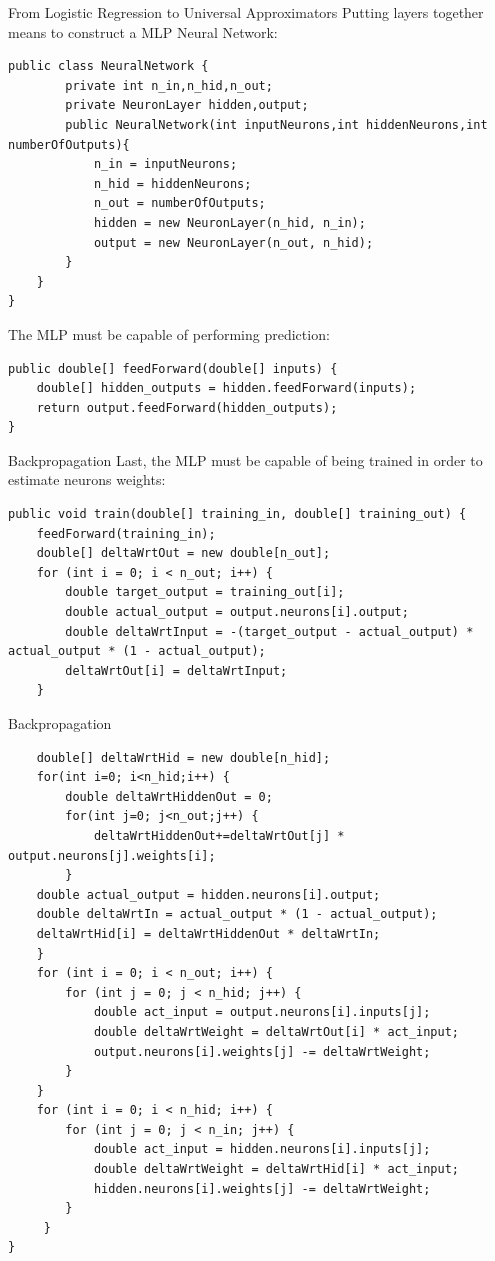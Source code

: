 \documentclass[xcolor ={table,usenames,dvipsnames}]{beamer}
\theoremstyle{definition}
\begin{document}
\begin{frame}[fragile]{From Logistic Regression to Universal Approximators}
Putting layers together means to construct a MLP Neural Network:
\begin{lstlisting}
public class NeuralNetwork {
		private int n_in,n_hid,n_out;
		private NeuronLayer hidden,output;
		public NeuralNetwork(int inputNeurons,int hiddenNeurons,int numberOfOutputs){
			n_in = inputNeurons;
			n_hid = hiddenNeurons;
			n_out = numberOfOutputs;
			hidden = new NeuronLayer(n_hid, n_in);
			output = new NeuronLayer(n_out, n_hid);
		}
	}
}
\end{lstlisting}
The MLP must be capable of performing prediction:
\begin{lstlisting}
public double[] feedForward(double[] inputs) {
	double[] hidden_outputs = hidden.feedForward(inputs);
	return output.feedForward(hidden_outputs);
}
\end{lstlisting}
\end{frame}
\begin{frame}[fragile]{Backpropagation}
Last, the MLP must be capable of being trained in order to estimate neurons weights:
\begin{lstlisting}
public void train(double[] training_in, double[] training_out) {
	feedForward(training_in);
	double[] deltaWrtOut = new double[n_out];
	for (int i = 0; i < n_out; i++) {
		double target_output = training_out[i];
		double actual_output = output.neurons[i].output;
		double deltaWrtInput = -(target_output - actual_output) * actual_output * (1 - actual_output);
		deltaWrtOut[i] = deltaWrtInput;
	}
\end{lstlisting}
\end{frame}
\begin{frame}[fragile]{Backpropagation}
\begin{lstlisting}
	double[] deltaWrtHid = new double[n_hid];
	for(int i=0; i<n_hid;i++) {
		double deltaWrtHiddenOut = 0;
		for(int j=0; j<n_out;j++) {
			deltaWrtHiddenOut+=deltaWrtOut[j] * output.neurons[j].weights[i];
		}
	double actual_output = hidden.neurons[i].output;
	double deltaWrtIn = actual_output * (1 - actual_output);
	deltaWrtHid[i] = deltaWrtHiddenOut * deltaWrtIn;
	}
	for (int i = 0; i < n_out; i++) {
		for (int j = 0; j < n_hid; j++) {
			double act_input = output.neurons[i].inputs[j];
			double deltaWrtWeight = deltaWrtOut[i] * act_input;
			output.neurons[i].weights[j] -= deltaWrtWeight;
		}
	}
	for (int i = 0; i < n_hid; i++) {
		for (int j = 0; j < n_in; j++) {
			double act_input = hidden.neurons[i].inputs[j];
			double deltaWrtWeight = deltaWrtHid[i] * act_input;
			hidden.neurons[i].weights[j] -= deltaWrtWeight;
		}
	 }
}
\end{lstlisting}
\end{frame}
\end{document}
